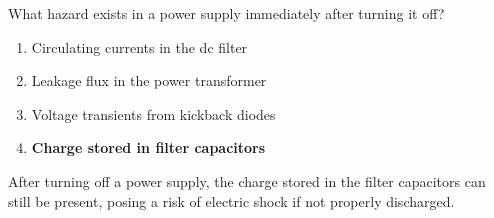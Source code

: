 \begin{tcolorbox}[colback=gray!10!white,colframe=black!75!black,title={T0A11}]
    What hazard exists in a power supply immediately after turning it off?
    \begin{enumerate}[label=\Alph*),noitemsep]
        \item Circulating currents in the dc filter
        \item Leakage flux in the power transformer
        \item Voltage transients from kickback diodes
        \item \textbf{Charge stored in filter capacitors}
    \end{enumerate}
\end{tcolorbox}
After turning off a power supply, the charge stored in the filter capacitors can still be present, posing a risk of electric shock if not properly discharged.
